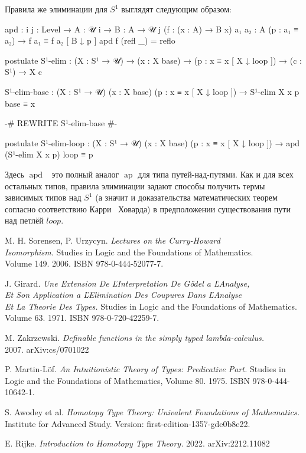 \documentclass{article}[12pt]
\newcommand{\dash}{\textemdash\ }
\newcommand{\op}{\operatorname}
\begin{document}
Правила же элиминации для $S^1$ выглядят следующим образом:
\begin{code}
apd : {i j : Level} → {A : 𝒰 i} → {B : A → 𝒰 j}
      (f : (x : A) → B x) {a₁ a₂ : A} (p : a₁ ≡ a₂)
    → f a₁ ≡ f a₂ [ B ↓ p ]
apd f (refl _) = reflo

postulate
  S¹-elim : (X : S¹ → 𝒰)
          → (x : X base)
          → (p : x ≡ x [ X ↓ loop ])
          → (c : S¹) 
          → X c
  
  S¹-elim-base : (X : S¹ → 𝒰)
                 (x : X base)
                 (p : x ≡ x [ X ↓ loop ])
               → S¹-elim X x p base ≡ x

{-# REWRITE S¹-elim-base #-}

postulate
  S¹-elim-loop : (X : S¹ → 𝒰)
                 (x : X base)
                 (p : x ≡ x [ X ↓ loop ])
               → apd (S¹-elim X x p) loop ≡ p
\end{code}

Здесь $\op{apd}$ \dash это полный аналог $\op{ap}$ для типа путей-над-путями. Как и для всех остальных
типов, правила элиминации задают способы получить термы зависимых типов над $S^1$ (а значит и доказательства
математических теорем согласно соответствию Карри \dash Ховарда) в предположении
существования пути над петлёй $loop$. 

\begin{thebibliography}{}
    M. H. Sorensen, P. Urzycyn. \textit{Lectures on the Curry-Howard \\ Isomorphism.}
    Studies in Logic and the Foundations of Mathematics. \\ Volume 149. 2006. ISBN
    978-0-444-52077-7.

    J. Girard. \textit{Une Extension De ĽInterpretation De Gödel a ĽAnalyse, \\ Et Son Application  a ĽElimination Des Coupures Dans ĽAnalyse  \\ Et La Theorie Des Types.}
    Studies in Logic and the Foundations of Mathematics. Volume 63. 1971. ISBN 978-0-720-42259-7.

    M. Zakrzewski. \textit{Definable functions in the simply typed lambda-calculus.} \\ 2007.
    arXiv:cs/0701022
    
    P. Martin-Löf. \textit{An Intuitionistic Theory of Types: Predicative Part.} Studies in Logic and the Foundations of Mathematics,
    Volume 80. 1975. ISBN 978-0-444-10642-1.

    S. Awodey et al. \textit{Homotopy Type Theory: Univalent Foundations of Mathematics.} Institute for Advanced Study.
    Version: first-edition-1357-gde0b8e22.

    E. Rijke. \textit{Introduction to Homotopy Type Theory.} 2022. arXiv:2212.11082
\end{thebibliography}
\end{document}
